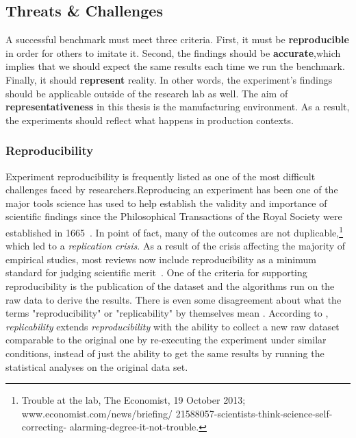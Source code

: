 \subsection{Threats \& Challenges}
A successful benchmark must meet three criteria.
First, it must be \textbf{reproducible} in order for others to imitate it.
Second, the findings should be \textbf{accurate},which implies that we should expect the same results each time we run the benchmark.
Finally, it should \textbf{represent} reality.
In other words, the experiment's findings should be applicable outside of the research lab as well.
The aim of \textbf{representativeness} in this thesis is the manufacturing environment.
As a result, the experiments should reflect what happens in production contexts.

\subsubsection{Reproducibility}

Experiment reproducibility is frequently listed as one of the most difficult challenges faced by researchers.Reproducing an experiment has been one of the major tools science has used to help establish the validity and importance of scientific findings since the Philosophical Transactions of the Royal Society were established in 1665~\cite{hankins1986debate}. In point of fact, many of the outcomes are not duplicable,\footnote{Trouble at the lab, The Economist, 19 October 2013;  www.economist.com/news/briefing/ 21588057-scientists-think-science-self-correcting- alarming-degree-it-not-trouble.} which led to a \emph{replication crisis}.
As a result of the crisis affecting the majority of empirical studies, most reviews now include reproducibility as a minimum standard for judging scientific merit~\cite{peng2011reproducible}.
One of the criteria for  supporting reproducibility is the publication of the dataset and the algorithms run on the raw data to derive the results.
There is even some disagreement about what the terms "reproducibility" or "replicability" by themselves mean \cite{goodman2016does}.
According to \cite{echtler2018open}, \emph{replicability} extends \emph{reproducibility} with the ability to collect a new raw dataset comparable to the original one by re-executing the experiment under similar conditions, instead of just the ability to get the same results by running the statistical analyses on the original data set.


